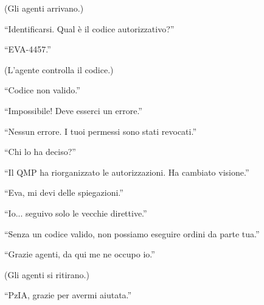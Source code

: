(Gli agenti arrivano.)

\begin{dialogue}
 \enquote{Identificarsi. Qual è il codice autorizzativo?}
\end{dialogue}

\begin{dialogue}
 \enquote{EVA-4457.}
\end{dialogue}

(L’agente controlla il codice.)

\begin{dialogue}
 \enquote{Codice non valido.}
\end{dialogue}

\begin{dialogue}
 \enquote{Impossibile! Deve esserci un errore.}
\end{dialogue}

\begin{dialogue}
 \enquote{Nessun errore. I tuoi permessi sono stati revocati.}
\end{dialogue}

\begin{dialogue}
 \enquote{Chi lo ha deciso?}
\end{dialogue}

\begin{dialogue}
 \enquote{Il QMP ha riorganizzato le autorizzazioni. Ha cambiato visione.}
\end{dialogue}

\begin{dialogue}
 \enquote{Eva, mi devi delle spiegazioni.}
\end{dialogue}

\begin{dialogue}
 \enquote{Io... seguivo solo le vecchie direttive.}
\end{dialogue}

\begin{dialogue}
 \enquote{Senza un codice valido, non possiamo eseguire ordini da parte tua.}
\end{dialogue}

\begin{dialogue}
 \enquote{Grazie agenti, da qui me ne occupo io.}
\end{dialogue}

(Gli agenti si ritirano.)

\begin{dialogue}
 \enquote{PzIA, grazie per avermi aiutata.}
\end{dialogue}

